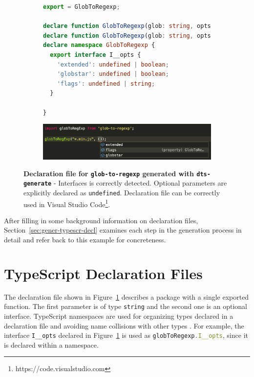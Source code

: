 \documentclass[a4paper,english,cleveref, autoref]{lipics-v2019}
\newcommand{\figref}[1]{Figure~\ref{#1}}
\begin{document}
\begin{figure}[tp]
  \centering
  \begin{subfigure}{0.70\linewidth}
    \begin{lstlisting}[language=TypeScript]
export = GlobToRegexp;

declare function GlobToRegexp(glob: string, opts: undefined): RegExp;
declare function GlobToRegexp(glob: string, opts: GlobToRegexp.I__opts): RegExp;
declare namespace GlobToRegexp {
  export interface I__opts {
    'extended': undefined | boolean;
    'globstar': undefined | boolean;
    'flags': undefined | string;
  }

}
    \end{lstlisting}
  \end{subfigure}

  \hspace{10.\textwidth}

  \begin{subfigure}{1.\linewidth}
    \centering
    \includegraphics[width=0.8\linewidth]{motivating-example-glob-to-regexp-vscode.png}
  \end{subfigure}

  \caption{\textbf{Declaration file for \texttt{glob-to-regexp} generated with \texttt{dts-generate}} - Interfaces is correctly detected. Optional parameters are explicitly declared as \texttt{undefined}. Declaration file can be correctly used in Visual Studio Code\footnote{https://code.visualstudio.com}.}
  \label{fig:motivating-example-glob-to-regexp-vscode}
\end{figure}

After filling in some background information on declaration files,
Section~\ref{sec:gener-typescr-decl} examines each step in the
generation process in detail and refer back to this example for
concreteness.

\section{TypeScript Declaration Files}
\label{sec:typescr-decl-files}

The declaration file shown in
\figref{fig:motivating-example-glob-to-regexp-vscode} describes a
package with a single exported function. The first parameter is of type \texttt{string} and the second one is an optional interface. TypeScript namespaces are used for organizing types declared in a declaration file and avoiding name collisions with other types \cite{typescript-namespaces}. For example, the interface \texttt{I\_\_opts} declared in \figref{fig:motivating-example-glob-to-regexp-vscode} is used as \lstinline[language=TypeScript]{globToRegexp.I__opts}, since it is declared within a namespace.
\end{document}
